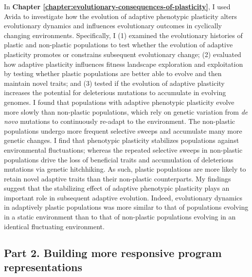 
In \textbf{Chapter \ref{chapter:evolutionary-consequences-of-plasticity}}, I used Avida to investigate how the evolution of adaptive phenotypic plasticity alters evolutionary dynamics and influences evolutionary outcomes in cyclically changing environments.
Specifically, I 
(1) examined the evolutionary histories of plastic and non-plastic populations to test whether the evolution of adaptive plasticity promotes or constrains subsequent evolutionary change;
(2) evaluated how adaptive plasticity influences fitness landscape exploration and exploitation by testing whether plastic populations are better able to evolve and then maintain novel traits;
and (3) tested if the evolution of adaptive plasticity increases the potential for deleterious mutations to accumulate in evolving genomes.
I found that populations with adaptive phenotypic plasticity evolve more slowly than non-plastic populations, which rely on genetic variation from \textit{de novo} mutations to continuously re-adapt to the environment.
The non-plastic populations undergo more frequent selective sweeps and accumulate many more genetic changes. %
I find that phenotypic plasticity stabilizes populations against environmental fluctuations; whereas the repeated selective sweeps in non-plastic populations drive the loss of beneficial traits and accumulation of deleterious mutations via genetic hitchhiking.  
As such, plastic populations are more likely to retain novel adaptive traits than their non-plastic counterparts. 
My findings suggest that the stabilizing effect of adaptive phenotypic plasticity plays an important role in subsequent adaptive evolution.
Indeed, evolutionary dynamics in adaptively plastic populations was more similar to that of populations evolving in a static environment than to that of non-plastic populations evolving in an identical fluctuating environment. 



\subsection{Part 2. Building more responsive program representations}

